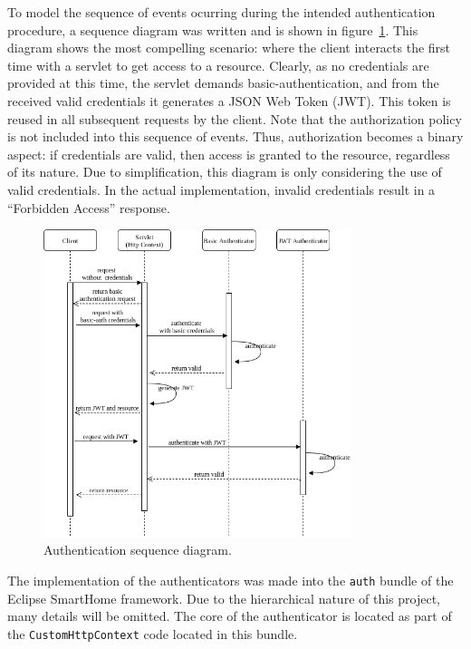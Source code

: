 \documentclass[12pt]{article}
\begin{document}
To model the sequence of events ocurring during the intended authentication procedure, a sequence diagram was written and is shown in figure~\ref{fig:esh_auth_sequence}. This diagram shows the most compelling scenario: where the client interacts the first time with a servlet to get access to a resource. Clearly, as no credentials are provided at this time, the servlet demands basic-authentication, and from the received valid credentials it generates a JSON Web Token (JWT). This token is reused in all subsequent requests by the client. Note that the authorization policy is not included into this sequence of events. Thus, authorization becomes a binary aspect: if credentials are valid, then access is granted to the resource, regardless of its nature. Due to simplification, this diagram is only considering the use of valid credentials. In the actual implementation, invalid credentials result in a ``Forbidden Access'' response. 

\begin{figure} [ht] 
\begin{center}
\includegraphics[width=0.8\textwidth]{esh_auth_sequence}
\caption{Authentication sequence diagram.}
\label{fig:esh_auth_sequence}
\end{center}
\end{figure}

The implementation of the authenticators was made into the \texttt{auth} bundle of the Eclipse SmartHome framework. Due to the hierarchical nature of this project, many details will be omitted. The core of the authenticator is located as part of the \texttt{CustomHttpContext} code located in this bundle.
\end{document}
